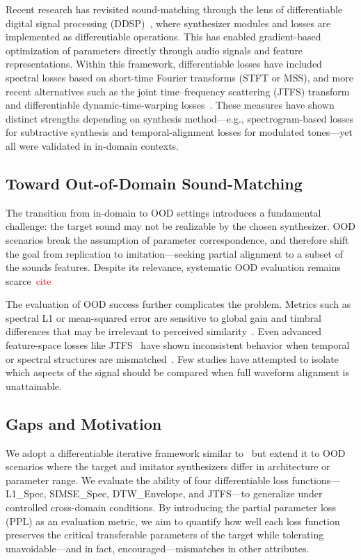 \documentclass[runningheads]{llncs}
\newcommand{\todo}[1]{\textcolor{red}{#1}}
\begin{document}
Recent research has revisited sound-matching through the lens of differentiable digital signal processing (DDSP)~\cite{engel2020ddsp}, where synthesizer modules and losses are implemented as differentiable operations.  
This has enabled gradient-based optimization of parameters directly through audio signals and feature representations.  
Within this framework, differentiable losses have included spectral losses based on short-time Fourier transforms (STFT or MSS), and more recent alternatives such as the joint time–frequency scattering (JTFS) transform~\cite{vahidi2023mesostructures} and differentiable dynamic-time-warping losses~\cite{salimi2025evaluating}.  
These measures have shown distinct strengths depending on synthesis method—e.g., spectrogram-based losses for subtractive synthesis and temporal-alignment losses for modulated tones—yet all were validated in in-domain contexts.

\subsection{Toward Out-of-Domain Sound-Matching}
The transition from in-domain to OOD settings introduces a fundamental challenge: the target sound may not be realizable by the chosen synthesizer. OOD scenarios break the assumption of parameter correspondence, and therefore shift the goal from replication to imitation—seeking partial alignment to a subset of the sounds features. Despite its relevance, systematic OOD evaluation remains scarce~\todo{cite}

The evaluation of OOD success further complicates the problem.  
Metrics such as spectral L1 or mean-squared error are sensitive to global gain and timbral differences that may be irrelevant to perceived similarity~\cite{turian2020sorry,salimi2025evaluating}.  
Even advanced feature-space losses like JTFS~\cite{anden2015joint} have shown inconsistent behavior when temporal or spectral structures are mismatched~\cite{salimi2025soundmatching}.  
Few studies have attempted to isolate which aspects of the signal should be compared when full waveform alignment is unattainable.

\subsection{Gaps and Motivation}
We adopt a differentiable iterative framework similar to~\cite{salimi2025evaluating} but extend it to OOD scenarios where the target and imitator synthesizers differ in architecture or parameter range.  
We evaluate the ability of four differentiable loss functions—L1\_Spec, SIMSE\_Spec, DTW\_Envelope, and JTFS—to generalize under controlled cross-domain conditions.  
By introducing the partial parameter loss (PPL) as an evaluation metric, we aim to quantify how well each loss function preserves the critical transferable parameters of the target while tolerating unavoidable---and in fact, encouraged---mismatches in other attributes.
\end{document}
